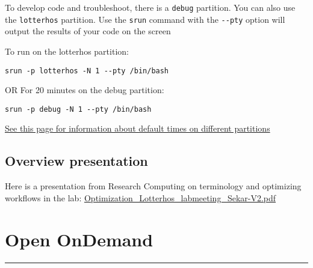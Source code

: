 \documentclass[
  letterpaper,
  DIV=11,
  numbers=noendperiod]{scrreprt}
\begin{document}

To develop code and troubleshoot, there is a \texttt{debug} partition.
You can also use the \texttt{lotterhos} partition. Use the \texttt{srun}
command with the \texttt{-\/-pty} option will output the results of your
code on the screen

To run on the lotterhos partition:

\texttt{srun\ -p\ lotterhos\ -N\ 1\ -\/-pty\ /bin/bash}

OR For 20 minutes on the debug partition:

\texttt{srun\ -p\ debug\ -N\ 1\ -\/-pty\ /bin/bash}

\href{https://rc-docs.northeastern.edu/en/latest/hardware/partitions.html\#introduction}{See
this page for information about default times on different partitions}

\hypertarget{overview-presentation}{%
\section*{\texorpdfstring{\textbf{Overview
presentation}}{Overview presentation}}\label{overview-presentation}}


Here is a presentation from Research Computing on terminology and
optimizing workflows in the lab:
\href{https://drk-lo.github.io/lotterhoslabprotocols/img/Optimization_Lotterhos_labmeeting_Sekar-V2.pdf}{Optimization\_Lotterhos\_labmeeting\_Sekar-V2.pdf}

\hypertarget{open-ondemand}{%
\chapter{Open OnDemand}\label{open-ondemand}}

\begin{center}\rule{0.5\linewidth}{0.5pt}\end{center}
\end{document}
